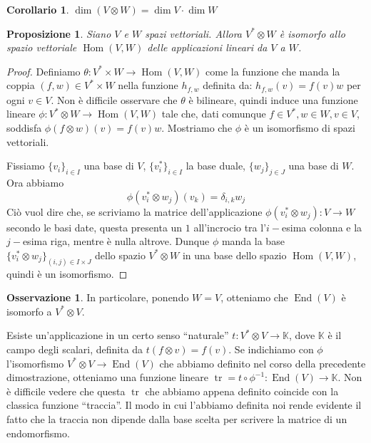 \documentclass[11pt]{article}
\theoremstyle{plain}
\newtheorem{prop}[thm]{Proposizione}
\newtheorem*{cor}{Corollario}
\theoremstyle{definition}
\newtheorem*{rem}{Osservazione}
\theoremstyle{remark}
\newcommand{\K}{\mathbb{K}}
\DeclareMathOperator{\tr}{tr}
\DeclareMathOperator{\Hom}{Hom}
\DeclareMathOperator{\End}{End}
\begin{document}
\begin{cor}
$\dim(V \otimes W) = \dim V \cdot \dim W$
\end{cor}


\begin{prop}
Siano $V$ e $W$ spazi vettoriali. Allora $V^*\otimes W$ è isomorfo allo spazio vettoriale $\Hom(V,W)$ delle applicazioni lineari da $V$ a $W$.
\end{prop}
\begin{proof}
Definiamo $\theta: V^*\times W \to \Hom(V,W)$ come la funzione che manda la coppia $(f, w)\in V^*\times W$ nella funzione  $h_{f,w}$ definita da:
$h_{f,w}(v) = f(v)w$ per ogni $v\in V$. Non è difficile osservare che $\theta$ è bilineare, quindi induce una funzione lineare
$\phi : V^*\otimes W \to \Hom(V,W)$ tale che, dati comunque $f\in V^*, w\in W, v\in V$, soddisfa $\phi(f\otimes w)(v) = f(v)w$.
Mostriamo che $\phi$ è un isomorfismo di spazi vettoriali.

Fissiamo $\{v_i\}_{i\in I}$ una base di $V$, $\{v_i^*\}_{i\in I}$ la base duale, $\{w_j\}_{j\in J}$ una base di $W$.
Ora abbiamo
\[\phi(v_i^*\otimes w_j)(v_k) = \delta_{i,k} w_j\]
Ciò vuol dire che, se scriviamo la matrice dell'applicazione $\phi(v_i^*\otimes w_j):V\to W$ secondo le basi date, questa presenta un $1$ all'incrocio
tra l'$i-$esima colonna e la $j-$esima riga, mentre è nulla altrove.
Dunque $\phi$ manda la base $\{v_i^*\otimes w_j\}_{(i,j)\in I\times J}$ dello spazio $V^*\otimes W$ in una base dello spazio $\Hom(V,W)$,
quindi è un isomorfismo.
\end{proof}

\begin{rem}
In particolare, ponendo $W=V$, otteniamo che $\End(V)$ è isomorfo a $V^*\otimes V$.

Esiste un'applicazione in un certo senso ``naturale'' $t:V^*\otimes V \to \K$, dove $\K$ è il campo degli scalari, definita da
$t(f\otimes v) = f(v)$.
Se indichiamo con $\phi$ l'isomorfismo $V^*\otimes V\to \End(V)$ che abbiamo definito nel corso della precedente dimostrazione,
otteniamo una funzione lineare $\tr = t\circ \phi^{-1}: \End(V)\to \K$. Non è difficile vedere che questa $\tr$ che abbiamo appena definito
coincide con la classica funzione ``traccia''. Il modo in cui l'abbiamo definita noi rende evidente il fatto che la traccia non dipende
dalla base scelta per scrivere la matrice di un endomorfismo.
\end{rem}
\end{document}
